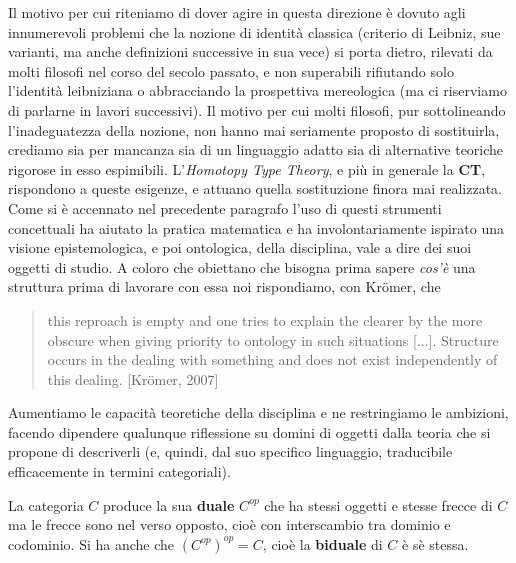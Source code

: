 \documentclass[a4paper, 11pt]{article}
\begin{document}
Il motivo per cui riteniamo di dover agire in questa direzione è dovuto agli innumerevoli problemi che la nozione di identità classica (criterio di Leibniz, sue varianti, ma anche definizioni successive in sua vece) si porta dietro, rilevati da molti filosofi nel corso del secolo passato, e non superabili rifiutando solo l'identità leibniziana o abbracciando la prospettiva mereologica (ma ci riserviamo di parlarne in lavori successivi). Il motivo per cui molti filosofi, pur sottolineando l'inadeguatezza della nozione, non hanno mai seriamente proposto di sostituirla, crediamo sia per mancanza sia di un linguaggio adatto sia di alternative teoriche rigorose in esso espimibili.
L'\textit{Homotopy Type Theory}, e più in generale la \textbf{CT}, rispondono a queste esigenze, e attuano quella sostituzione finora mai realizzata.
Come si è accennato nel precedente paragrafo l'uso di questi strumenti concettuali ha aiutato la pratica matematica e ha involontariamente ispirato una visione epistemologica, e poi ontologica, della disciplina, vale a dire dei suoi oggetti di studio. A coloro che obiettano che bisogna prima sapere \textit{cos'è} una struttura prima di lavorare con essa noi rispondiamo, con Kr\"omer, che
\begin{quotation}
	this reproach is empty and one tries to explain the clearer by the more obscure when giving priority to ontology in such situations [...]. Structure occurs in the dealing with something and does
	not exist independently of this dealing. [Kr\"omer, 2007]
\end{quotation}
Aumentiamo le capacità teoretiche della disciplina e ne restringiamo le ambizioni, facendo dipendere qualunque riflessione su domini di oggetti dalla teoria che si propone di descriverli (e, quindi, dal suo specifico linguaggio, traducibile efficacemente in termini categoriali).

La categoria $C$ produce la sua \textbf{duale} $C^{op}$ che ha stessi oggetti e stesse frecce di $C$ ma le frecce sono nel verso opposto, cioè con interscambio tra dominio e codominio. Si ha anche che $(C^{op})^{op} = C$, cioè la \textbf{biduale} di $C$ è sè stessa.
\end{document}
